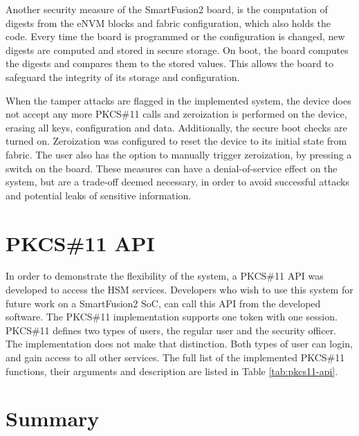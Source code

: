 Another security measure of the SmartFusion2 board, is the computation of digests from the eNVM blocks and fabric configuration, which also holds the code. Every time the board is programmed or the configuration is changed, new digests are computed and stored in secure storage. On boot, the board computes the digests and compares them to the stored values. This allows the board to safeguard the integrity of its storage and configuration.

When the tamper attacks are flagged in the implemented system, the device does not accept any more PKCS\#11 calls and zeroization is performed on the device, erasing all keys, configuration and data. Additionally, the secure boot checks are turned on.
Zeroization was configured to reset the device to its initial state from fabric.
The user also has the option to manually trigger zeroization, by pressing a switch on the board.
These measures can have a denial-of-service effect on the system, but are a trade-off deemed necessary, in order to avoid successful attacks and potential leaks of sensitive information.

\section{PKCS\#11 API}\label{chap:implementation:app:pkcs}

In order to demonstrate the flexibility of the system, a PKCS\#11 API was developed to access the HSM services. Developers who wish to use this system for future work on a SmartFusion2 SoC, can call this API from the developed software.
The PKCS\#11 implementation supports one token with one session.
PKCS\#11 defines two types of users, the regular user and the security officer. The implementation does not make that distinction. Both types of user can login, and gain access to all other services.
The full list of the implemented PKCS\#11 functions, their arguments and description are listed in Table \ref{tab:pkcs11-api}.

\section*{Summary}\label{chap:implementation:summary}

